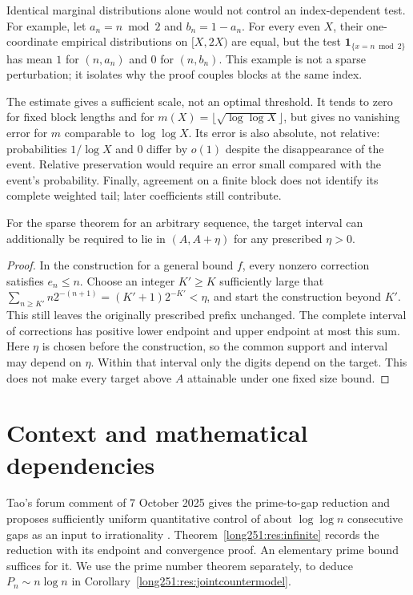 Identical marginal distributions alone would not control an
index-dependent test.  For example, let $a_n=n\bmod2$ and $b_n=1-a_n$.
For every even $X$, their one-coordinate empirical distributions on
$[X,2X)$ are equal, but the test $\mathbf{1}_{\{x=n\bmod2\}}$ has mean
$1$ for $(n,a_n)$ and $0$ for $(n,b_n)$.  This example is not a sparse
perturbation; it isolates why the proof couples blocks at the same index.

The estimate gives a sufficient scale, not an optimal threshold.  It
tends to zero for fixed block lengths and for
$m(X)=\lfloor\sqrt{\log\log X}\rfloor$, but gives no vanishing error for
$m$ comparable to $\log\log X$.  Its error is also absolute, not relative:
probabilities $1/\log X$ and $0$ differ by $o(1)$ despite the disappearance
of the event.  Relative preservation would require an error small compared
with the event's probability.  Finally, agreement on a finite block does
not identify its complete weighted tail; later coefficients still contribute.



\begin{corollary}\label{long251:res:local-targets}
For the sparse theorem for an arbitrary sequence, the target interval can additionally
be required to lie in $(A,A+\eta)$ for any prescribed $\eta>0$.
\end{corollary}
\begin{proof}
In the construction for a general bound $f$, every nonzero correction satisfies $e_n\le n$.
Choose an integer $K'\ge K$ sufficiently large that
$\sum_{n\ge K'}n2^{-(n+1)}=(K'+1)2^{-K'}<\eta$, and start the construction
beyond $K'$.  This still leaves the originally prescribed prefix unchanged.
The complete interval of corrections has positive lower endpoint and
upper endpoint at most this sum.  Here $\eta$ is chosen before the
construction, so the common support and interval may depend on $\eta$.
Within that interval only the digits depend on the target.  This does
not make every target above $A$ attainable under one fixed size bound.
\end{proof}

\section{Context and mathematical dependencies}\label{long251:sec:context}
Tao's forum comment of 7 October 2025 gives the prime-to-gap reduction
and proposes sufficiently uniform quantitative control of about
$\log\log n$ consecutive gaps as an input to irrationality
\cite[comment of 7 October 2025]{erdosproblems251thread}.
Theorem~\ref{long251:res:infinite} records the reduction with its endpoint
and convergence proof.  An elementary prime bound suffices for it.
We use the prime number theorem separately, to deduce
$P_n\sim n\log n$ in Corollary~\ref{long251:res:jointcountermodel}.

